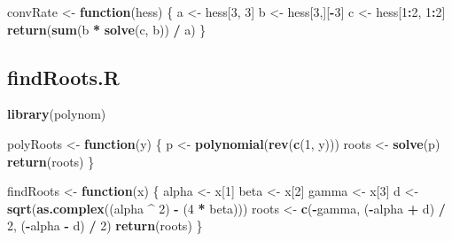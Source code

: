 \documentclass[
  12pt,
]{article}
\newenvironment{Shaded}{\begin{snugshade}}{\end{snugshade}}
\newcommand{\ControlFlowTok}[1]{\textcolor[rgb]{0.13,0.29,0.53}{\textbf{#1}}}
\newcommand{\DecValTok}[1]{\textcolor[rgb]{0.00,0.00,0.81}{#1}}
\newcommand{\FunctionTok}[1]{\textcolor[rgb]{0.13,0.29,0.53}{\textbf{#1}}}
\newcommand{\NormalTok}[1]{#1}
\newcommand{\OtherTok}[1]{\textcolor[rgb]{0.56,0.35,0.01}{#1}}
\newcommand{\SpecialCharTok}[1]{\textcolor[rgb]{0.81,0.36,0.00}{\textbf{#1}}}
\begin{document}
\begin{Shaded}
\begin{Highlighting}[]
\NormalTok{convRate }\OtherTok{\textless{}{-}} \ControlFlowTok{function}\NormalTok{(hess) \{}
\NormalTok{  a }\OtherTok{\textless{}{-}}\NormalTok{ hess[}\DecValTok{3}\NormalTok{, }\DecValTok{3}\NormalTok{]}
\NormalTok{  b }\OtherTok{\textless{}{-}}\NormalTok{ hess[}\DecValTok{3}\NormalTok{,][}\SpecialCharTok{{-}}\DecValTok{3}\NormalTok{]}
\NormalTok{  c }\OtherTok{\textless{}{-}}\NormalTok{ hess[}\DecValTok{1}\SpecialCharTok{:}\DecValTok{2}\NormalTok{, }\DecValTok{1}\SpecialCharTok{:}\DecValTok{2}\NormalTok{]}
  \FunctionTok{return}\NormalTok{(}\FunctionTok{sum}\NormalTok{(b }\SpecialCharTok{*} \FunctionTok{solve}\NormalTok{(c, b)) }\SpecialCharTok{/}\NormalTok{ a)}
\NormalTok{\}}
\end{Highlighting}
\end{Shaded}

\normalsize

\subsection{findRoots.R}\label{findroots.r}

\footnotesize

\begin{Shaded}
\begin{Highlighting}[]
\FunctionTok{library}\NormalTok{(polynom)}

\NormalTok{polyRoots }\OtherTok{\textless{}{-}} \ControlFlowTok{function}\NormalTok{(y) \{}
\NormalTok{  p }\OtherTok{\textless{}{-}} \FunctionTok{polynomial}\NormalTok{(}\FunctionTok{rev}\NormalTok{(}\FunctionTok{c}\NormalTok{(}\DecValTok{1}\NormalTok{, y)))}
\NormalTok{  roots }\OtherTok{\textless{}{-}} \FunctionTok{solve}\NormalTok{(p)}
  \FunctionTok{return}\NormalTok{(roots)}
\NormalTok{\}}

\NormalTok{findRoots }\OtherTok{\textless{}{-}} \ControlFlowTok{function}\NormalTok{(x) \{}
\NormalTok{  alpha }\OtherTok{\textless{}{-}}\NormalTok{ x[}\DecValTok{1}\NormalTok{]}
\NormalTok{  beta }\OtherTok{\textless{}{-}}\NormalTok{ x[}\DecValTok{2}\NormalTok{]}
\NormalTok{  gamma }\OtherTok{\textless{}{-}}\NormalTok{ x[}\DecValTok{3}\NormalTok{]}
\NormalTok{  d }\OtherTok{\textless{}{-}} \FunctionTok{sqrt}\NormalTok{(}\FunctionTok{as.complex}\NormalTok{((alpha }\SpecialCharTok{\^{}} \DecValTok{2}\NormalTok{) }\SpecialCharTok{{-}}\NormalTok{ (}\DecValTok{4} \SpecialCharTok{*}\NormalTok{ beta)))}
\NormalTok{  roots }\OtherTok{\textless{}{-}} \FunctionTok{c}\NormalTok{(}\SpecialCharTok{{-}}\NormalTok{gamma, (}\SpecialCharTok{{-}}\NormalTok{alpha }\SpecialCharTok{+}\NormalTok{ d) }\SpecialCharTok{/} \DecValTok{2}\NormalTok{, (}\SpecialCharTok{{-}}\NormalTok{alpha }\SpecialCharTok{{-}}\NormalTok{ d) }\SpecialCharTok{/} \DecValTok{2}\NormalTok{)}
  \FunctionTok{return}\NormalTok{(roots)}
\NormalTok{\}}
\end{Highlighting}
\end{Shaded}
\end{document}
